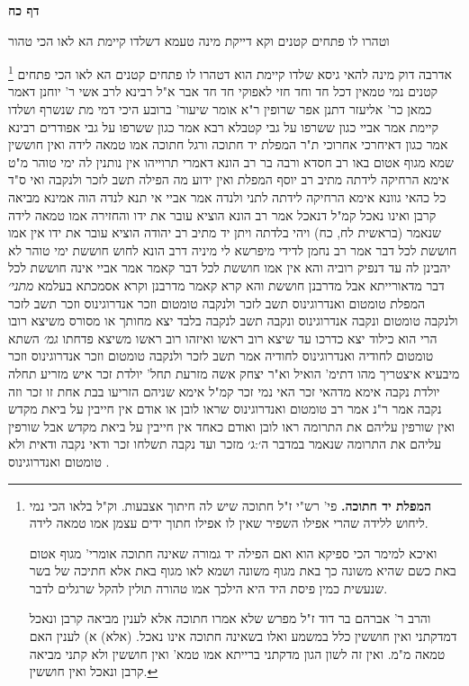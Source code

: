 \documentclass[12pt, openany]{book}
\newcommand{\sethebfont}{
\fontsize{10.5pt}{21.0pt} \selectfont
}
\newcommand{\twocol}[1]{
	{\sethebfont \begin{multicols}{2}
			#1
	\end{multicols}}	
}
\newcommand{\sectname}{}
\newcommand{\newsection}[1]{
	\addcontentsline{toc}{section}{#1}
	\renewcommand{\sectname}{#1}	
	\vspace{-\baselineskip}
	\begin{center}
		\textbf{%
\fontsize{16pt}{16pt}\selectfont
			#1}
	\end{center}
	\vspace{-\baselineskip}
	\nopagebreak
}
\newcommand{\footnotecomment}[1]{
	\renewcommand\thefootnote{}
	\footnote{#1}}
\newcommand{\commenta}[1]{\footnotecomment{#1}}
\begin{document}
\newsection{דף כח}
\twocol{וטהרו לו פתחים קטנים וקא דייקת מינה טעמא דשלדו קיימת הא לאו הכי טהור 
\commenta{\textbf{המפלת יד חתוכה.} פי' רש"י ז"ל חתוכה שיש לה חיתוך אצבעות. וק"ל בלאו הכי נמי ליחוש ללידה שהרי אפילו השפיר שאין לו אפילו חתוך ידים עצמן אמו טמאה לידה.\par ואיכא למימר הכי ספיקא הוא ואם הפילה יד גמורה שאינה חתוכה אומרי' מגוף אטום באת כשם שהיא משונה כך באת מגוף משונה ושמא לאו מגוף באת אלא חתיכה של בשר שנעשית כמין פיסת היד היא הילכך אמו טהורה תולין להקל שרגלים לדבר.\par והרב ר' אברהם בר דוד ז"ל מפרש שלא אמרו חתוכה אלא לענין מביאה קרבן ונאכל דמדקתני ואין חוששין כלל במשמע ואלו בשאינה חתוכה אינו נאכל. (אלא) א) לענין האם טמאה מ"מ. ואין זה לשון הגון מדקתני ברייתא אמו טמא' ואין חוששין ולא קתני מביאה קרבן ונאכל ואין חוששין. }
אדרבה דוק מינה להאי גיסא שלדו קיימת הוא דטהרו לו פתחים קטנים הא לאו הכי פתחים קטנים נמי טמאין דכל חד וחד חזי לאפוקי חד חד אבר 
א"ל רבינא לרב אשי ר' יוחנן דאמר כמאן כר' אליעזר דתנן אפר שרופין ר"א אומר שיעור' ברובע 
היכי דמי מת שנשרף ושלדו קיימת אמר אביי כגון ששרפו על גבי קטבלא רבא אמר כגון ששרפו על גבי אפודרים רבינא אמר כגון דאיחרכי אחרוכי 
ת"ר המפלת יד חתוכה ורגל חתוכה אמו טמאה לידה ואין חוששין שמא מגוף אטום באו 
רב חסדא ורבה בר רב הונא דאמרי תרוייהו אין נותנין לה ימי טוהר מ"ט אימא הרחיקה לידתה 
מתיב רב יוסף המפלת ואין ידוע מה הפילה תשב לזכר ולנקבה ואי ס"ד כל כהאי גוונא אימא הרחיקה לידתה לתני ולנדה 
אמר אביי אי תנא לנדה הוה אמינא מביאה קרבן ואינו נאכל קמ"ל דנאכל 
אמר רב הונא הוציא עובר את ידו והחזירה אמו טמאה לידה שנאמר (בראשית לח, כח) ויהי בלדתה ויתן יד 
מתיב רב יהודה הוציא עובר את ידו אין אמו חוששת לכל דבר אמר רב נחמן לדידי מיפרשא לי מיניה דרב הונא לחוש חוששת ימי טוהר לא יהבינן לה עד דנפיק רוביה 
והא אין אמו חוששת לכל דבר קאמר אמר אביי אינה חוששת לכל דבר מדאורייתא אבל מדרבנן חוששת והא קרא קאמר מדרבנן וקרא אסמכתא בעלמא
{\large\emph{מתני׳}} המפלת טומטום ואנדרוגינוס תשב לזכר ולנקבה
טומטום וזכר אנדרוגינוס וזכר תשב לזכר ולנקבה טומטום ונקבה אנדרוגינוס ונקבה תשב לנקבה בלבד 
יצא מחותך או מסורס משיצא רובו הרי הוא כילוד יצא כדרכו עד שיצא רוב ראשו ואיזהו רוב ראשו משיצא פדחתו
{\large\emph{גמ׳}} השתא טומטום לחודיה ואנדרוגינוס לחודיה אמר תשב לזכר ולנקבה טומטום וזכר אנדרוגינוס וזכר מיבעיא
איצטריך מהו דתימ' הואיל וא"ר יצחק אשה מזרעת תחל' יולדת זכר איש מזריע תחלה יולדת נקבה אימא מדהאי זכר האי נמי זכר קמ"ל אימא שניהם הזריעו בבת אחת זו זכר וזה נקבה 
אמר ר"נ אמר רב טומטום ואנדרוגינוס שראו לובן או אודם אין חייבין על ביאת מקדש ואין שורפין עליהם את התרומה 
ראו לובן ואודם כאחד אין חייבין על ביאת מקדש אבל שורפין עליהם את התרומה שנאמר {במדבר ה׳:ג׳ } מזכר ועד נקבה
תשלחו זכר ודאי נקבה ודאית ולא טומטום ואנדרוגינוס .
}
\end{document}
